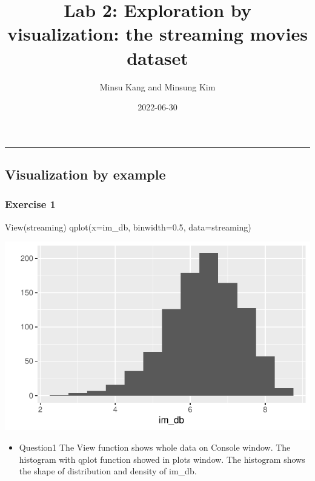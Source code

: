 \documentclass[
  11pt,
]{article}
\title{Lab 2: Exploration by visualization: the streaming movies
dataset}
\author{Minsu Kang and Minsung Kim}
\date{2022-06-30}
\newenvironment{Shaded}{\begin{snugshade}}{\end{snugshade}}
\newcommand{\AttributeTok}[1]{\textcolor[rgb]{0.77,0.63,0.00}{#1}}
\newcommand{\FloatTok}[1]{\textcolor[rgb]{0.00,0.00,0.81}{#1}}
\newcommand{\FunctionTok}[1]{\textcolor[rgb]{0.00,0.00,0.00}{#1}}
\newcommand{\NormalTok}[1]{#1}
\providecommand{\tightlist}{%
  \setlength{\itemsep}{0pt}\setlength{\parskip}{0pt}}
\begin{document}
\maketitle

\begin{center}\rule{0.5\linewidth}{0.5pt}\end{center}

\hypertarget{visualization-by-example}{%
\subsection{Visualization by example}\label{visualization-by-example}}

\hypertarget{exercise-1}{%
\subsubsection{Exercise 1}\label{exercise-1}}

\begin{Shaded}
\begin{Highlighting}[]
\FunctionTok{View}\NormalTok{(streaming)}
\FunctionTok{qplot}\NormalTok{(}\AttributeTok{x=}\NormalTok{im\_db, }\AttributeTok{binwidth=}\FloatTok{0.5}\NormalTok{, }\AttributeTok{data=}\NormalTok{streaming)}
\end{Highlighting}
\end{Shaded}

\begin{center}\includegraphics[width=0.8\linewidth]{lab02_files/figure-latex/unnamed-chunk-1-1} \end{center}

\begin{itemize}
\tightlist
\item
  Question1 The View function shows whole data on Console window. The
  histogram with qplot function showed in plots window. The histogram
  shows the shape of distribution and density of im\_db.
\end{itemize}
\end{document}

